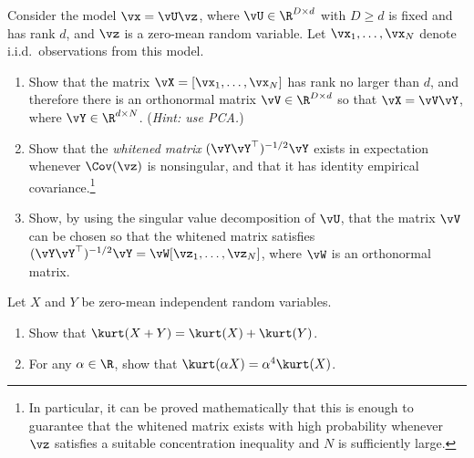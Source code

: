 \documentclass[../../book-main.tex]{subfiles}
\begin{document}
\begin{exercise}\label{exercise:whitening}
    Consider the model $\vx = \vU \vz$, where $\vU \in \R^{D \times d}$ with $D \geq d$ is fixed and has rank $d$, and $\vz$ is a zero-mean random variable. Let $\vx_1, \dots, \vx_N$ denote i.i.d.\ observations from this model.
    \begin{enumerate}
        \item Show that the matrix $\vX = [\vx_1, \dots, \vx_N]$ has rank no larger than $d$, and therefore there is an orthonormal matrix $\vV \in \R^{D \times d}$ so that $\vX = \vV \vY$, where $\vY \in \R^{d \times N}$. (\textit{Hint: use PCA.})
        \item Show that the \textit{whitened matrix} $(\vY \vY^\top)^{-1/2}\vY$ exists in expectation whenever $\Cov(\vz)$ is nonsingular, and that it has identity empirical covariance.\footnote{In particular, it can be proved mathematically that this is enough to guarantee that the whitened matrix exists with high probability whenever $\vz$ satisfies a suitable concentration inequality and $N$ is sufficiently large.}
        \item Show, by using the singular value decomposition of $\vU$, that the matrix $\vV$ can be chosen so that the whitened matrix satisfies $(\vY \vY^\top)^{-1/2} \vY = \vW [\vz_1, \dots, \vz_N]$, where $\vW$ is an orthonormal matrix.
    \end{enumerate}
\end{exercise}

\begin{exercise}\label{exercise:kurtosis-linearity-properties}
    Let $X$ and $Y$ be zero-mean independent random variables.
    \begin{enumerate}
        \item Show that $\kurt(X + Y) = \kurt(X) + \kurt(Y)$.
        \item For any $\alpha \in \R$, show that $\kurt(\alpha X) = \alpha^4 \kurt(X)$.
    \end{enumerate}
\end{exercise}
\end{document}
